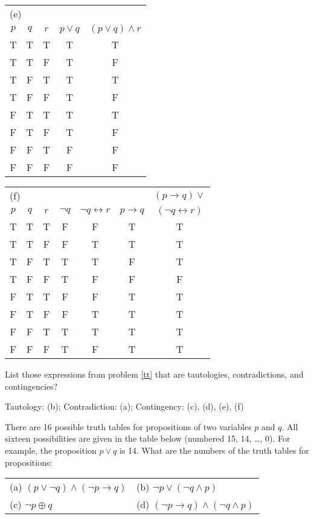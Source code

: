 \documentclass[12pt,addpoints]{exam}
\newcommand{\ra}{\rightarrow}
\newcommand{\lra}{\leftrightarrow}
\begin{document}
\begin{questions}
\begin{solution}
        \smallskip
        \begin{tabular}{c|c|c||c|c}
            \multicolumn{4}{l}{(e)} & \\
            $p$ & $q$ & $r$ & $p \vee q$ & $(p \vee q) \wedge r$ \\
         \hline
            T & T & T & T & T \\
            T & T & F & T & F \\
            T & F & T & T & T \\
            T & F & F & T & F \\
          \hline
            F & T & T & T & T \\
            F & T & F & T & F \\
            F & F & T & F & F \\
            F & F & F & F & F
         \end{tabular} \hspace{0.4in}
         \begin{tabular}{c|c|c||c|c|c|c}
            \multicolumn{6}{l}{(f)} & $(p \ra q) \vee$ \\
            $p$ & $q$ & $r$ & $\neg q$ & $\neg q \lra r$ & $p \ra q$ & $ (\neg q \lra r)$ \\
         \hline
            T & T & T & F & F & T & T\\
            T & T & F & F & T & T & T\\
            T & F & T & T & T & F & T\\
            T & F & F & T & F & F & F\\
          \hline
            F & T & T & F & F & T & T\\
            F & T & F & F & T & T & T\\
            F & F & T & T & T & T & T\\
            F & F & F & T & F & T & T
         \end{tabular}
    \end{solution}

\question[3] List those expressions from problem \ref{tt} that are tautologies, contradictions, and contingencies?
    \ifprintanswers
        \vspace{-10pt}
    \fi
    \begin{solution}
       Tautology: (b);
       Contradiction: (a);
       Contingency: (c), (d), (e), (f)
    \end{solution}

\question[4] There are 16 possible truth tables for propositions of two variables $p$ and $q$.
 All sixteen possibilities are given in the table below (numbered 15, 14, \ldots, 0).
 For example, the proposition $p \vee q$ is 14. What are the numbers of the truth
 tables for propositions:
\begin{center}
 \begin{tabular}{ll}
    (a) $(p \vee \neg q) \wedge (\neg p \ra q)$ \quad &  (b) $\neg p \vee (\neg q \wedge p)$ \\
    (c) $\neg p \oplus q $ \quad \quad& (d) $(\neg p \ra q) \wedge (\neg q \wedge p)$ \\
 \end{tabular}


\end{center}
\end{questions}
\end{document}
